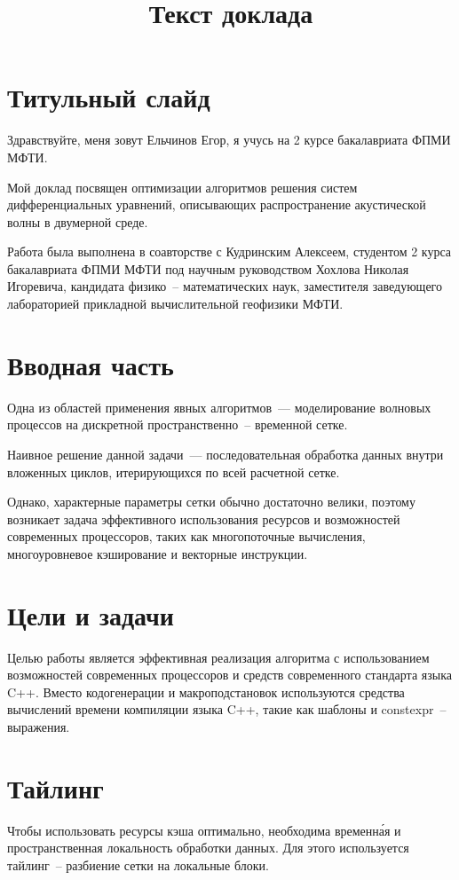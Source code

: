 \documentclass[18pt]{article}
\title{Текст доклада}
\begin{document}
\section{Титульный слайд}
\par
Здравствуйте, меня зовут Ельчинов Егор, я учусь на 2 курсе 
бакалавриата ФПМИ МФТИ.

Мой доклад посвящен оптимизации алгоритмов решения 
систем дифференциальных уравнений, описывающих распространение акустической
волны в двумерной среде.

Работа была выполнена в соавторстве с Кудринским Алексеем, студентом 2 курса
бакалавриата ФПМИ МФТИ под научным руководством Хохлова Николая Игоревича, 
кандидата физико~-- математических наук, заместителя заведующего 
лабораторией прикладной вычислительной геофизики МФТИ.

\section{Вводная часть}
\par
Одна из областей применения явных алгоритмов~--- моделирование волновых 
процессов на дискретной пространственно~-- временной сетке.

Наивное решение данной задачи~--- последовательная обработка 
данных внутри вложенных циклов, итерирующихся по всей расчетной сетке.

Однако, характерные параметры сетки обычно достаточно велики, 
поэтому возникает задача эффективного использования 
ресурсов и возможностей современных процессоров, 
таких как многопоточные вычисления, многоуровневое кэширование и 
векторные инструкции.

\section{Цели и задачи}
\par
Целью работы является эффективная реализация алгоритма 
с использованием возможностей современных процессоров и 
средств современного стандарта языка C++.
Вместо кодогенерации и макроподстановок используются средства вычислений
времени компиляции языка C++, такие как шаблоны и constexpr~-- выражения.

\section{Тайлинг}
\par
Чтобы использовать ресурсы кэша оптимально, необходима временн\'{а}я и 
пространственная локальность обработки данных.
Для этого используется тайлинг~-- разбиение сетки на локальные блоки.
\end{document}
